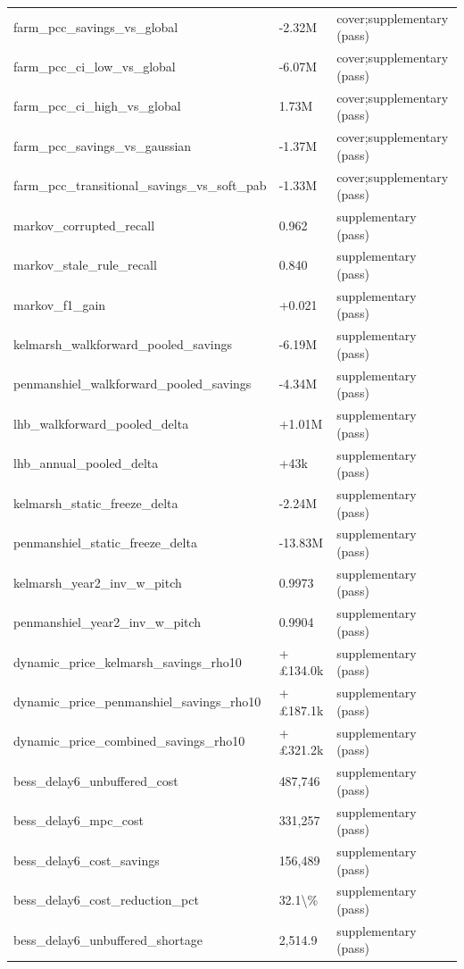 \begin{table}[H]
\begin{tabular}{lll}
farm\_pcc\_savings\_vs\_global & -2.32M & cover;supplementary (pass) \\
farm\_pcc\_ci\_low\_vs\_global & -6.07M & cover;supplementary (pass) \\
farm\_pcc\_ci\_high\_vs\_global & 1.73M & cover;supplementary (pass) \\
farm\_pcc\_savings\_vs\_gaussian & -1.37M & cover;supplementary (pass) \\
farm\_pcc\_transitional\_savings\_vs\_soft\_pab & -1.33M & cover;supplementary (pass) \\
markov\_corrupted\_recall & 0.962 & supplementary (pass) \\
markov\_stale\_rule\_recall & 0.840 & supplementary (pass) \\
markov\_f1\_gain & +0.021 & supplementary (pass) \\
kelmarsh\_walkforward\_pooled\_savings & -6.19M & supplementary (pass) \\
penmanshiel\_walkforward\_pooled\_savings & -4.34M & supplementary (pass) \\
lhb\_walkforward\_pooled\_delta & +1.01M & supplementary (pass) \\
lhb\_annual\_pooled\_delta & +43k & supplementary (pass) \\
kelmarsh\_static\_freeze\_delta & -2.24M & supplementary (pass) \\
penmanshiel\_static\_freeze\_delta & -13.83M & supplementary (pass) \\
kelmarsh\_year2\_inv\_w\_pitch & 0.9973 & supplementary (pass) \\
penmanshiel\_year2\_inv\_w\_pitch & 0.9904 & supplementary (pass) \\
dynamic\_price\_kelmarsh\_savings\_rho10 & +£134.0k & supplementary (pass) \\
dynamic\_price\_penmanshiel\_savings\_rho10 & +£187.1k & supplementary (pass) \\
dynamic\_price\_combined\_savings\_rho10 & +£321.2k & supplementary (pass) \\
bess\_delay6\_unbuffered\_cost & 487,746 & supplementary (pass) \\
bess\_delay6\_mpc\_cost & 331,257 & supplementary (pass) \\
bess\_delay6\_cost\_savings & 156,489 & supplementary (pass) \\
bess\_delay6\_cost\_reduction\_pct & 32.1\textbackslash{}\% & supplementary (pass) \\
bess\_delay6\_unbuffered\_shortage & 2,514.9 & supplementary (pass) \\

\end{tabular}
\end{table}
